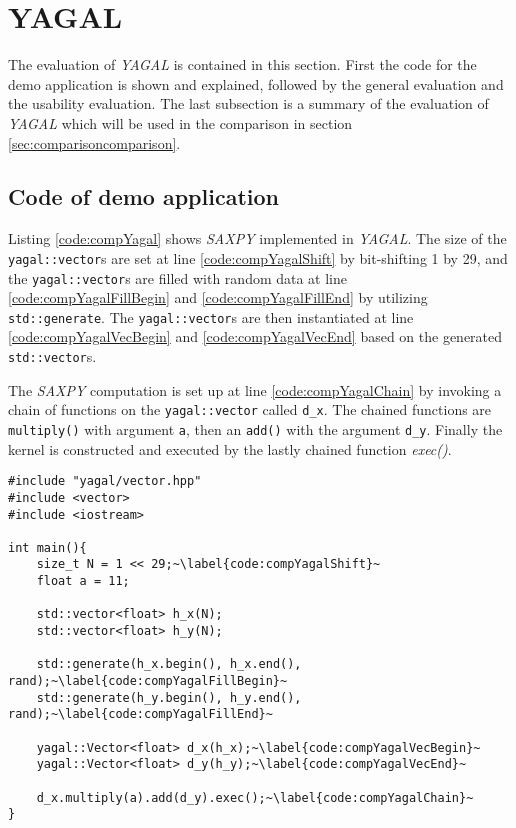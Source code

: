 \section{YAGAL}
The evaluation of \textit{YAGAL} is contained in this section. First the code for the demo application is shown and explained, followed by the general evaluation and the usability evaluation. The last subsection is a summary of the evaluation of \textit{YAGAL} which will be used in the comparison in section \ref{sec:comparisoncomparison}.

\subsection{Code of demo application}
Listing \ref{code:compYagal} shows \textit{SAXPY} implemented in \textit{YAGAL}. The size of the \texttt{yagal::vector}s are set at line \ref{code:compYagalShift} by bit-shifting 1 by 29, and the \texttt{yagal::vector}s are filled with random data at line \ref{code:compYagalFillBegin} and \ref{code:compYagalFillEnd} by utilizing \texttt{std::generate}. The \texttt{yagal::vector}s are then instantiated at line \ref{code:compYagalVecBegin} and \ref{code:compYagalVecEnd} based on the generated \texttt{std::vector}s.

The \textit{SAXPY} computation is set up at line \ref{code:compYagalChain} by invoking a chain of functions on the \texttt{yagal::vector} called \texttt{d\_x}. The chained functions are \texttt{multiply()} with argument \texttt{a}, then an \texttt{add()} with the argument \texttt{d\_y}. Finally the kernel is constructed and executed by the lastly chained function \textit{exec()}.

\begin{lstlisting}[caption={\textit{YAGAL} \textit{SAXPY}.}, label={code:compYagal}]
#include "yagal/vector.hpp"
#include <vector>
#include <iostream>

int main(){
    size_t N = 1 << 29;~\label{code:compYagalShift}~
    float a = 11;

    std::vector<float> h_x(N);
    std::vector<float> h_y(N);

    std::generate(h_x.begin(), h_x.end(), rand);~\label{code:compYagalFillBegin}~
    std::generate(h_y.begin(), h_y.end(), rand);~\label{code:compYagalFillEnd}~

    yagal::Vector<float> d_x(h_x);~\label{code:compYagalVecBegin}~
    yagal::Vector<float> d_y(h_y);~\label{code:compYagalVecEnd}~
    
    d_x.multiply(a).add(d_y).exec();~\label{code:compYagalChain}~
}
\end{lstlisting}

